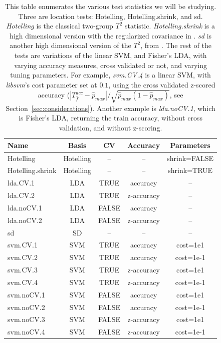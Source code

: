 \documentclass[12pt,a4paper]{article}
\newcommand{\hyp}{f} %
\newcommand{\hypEstim}{\hat{\hyp}} %
\newcommand{\acc}{T^{acc}}
\newcommand{\dominant}{\hat{p}_{max}}
\begin{document}
\begin{table}[th]
\centering
\begin{tabular}{l|c|c|c|c}
Name & Basis & CV & Accuracy & Parameters\\ 
\hline
\hline
Hotelling & Hotelling & -- & -- & shrink=FALSE\\ 
Hotelling.shrink & Hotelling & -- & -- & shrink=TRUE \\ 
lda.CV.1 & LDA & TRUE & accuracy &  -- \\ 
lda.CV.2 & LDA & TRUE & z-accuracy & -- \\ 
lda.noCV.1 & LDA & FALSE & accuracy &  --\\ 
lda.noCV.2 & LDA & FALSE & z-accuracy &  --\\ 
sd & SD & -- & -- & -- \\ 
svm.CV.1 & SVM & TRUE & accuracy & cost=1e1 \\ 
svm.CV.2 & SVM & TRUE & accuracy & cost=1e-1 \\ 
svm.CV.3 & SVM & TRUE & z-accuracy & cost=1e1 \\ 
svm.CV.4 & SVM & TRUE & z-accuracy & cost=1e-1 \\ 
svm.noCV.1 & SVM & FALSE & accuracy & cost=1e1 \\ 
svm.noCV.2 & SVM & FALSE & accuracy & cost=1e-1 \\ 
svm.noCV.3 & SVM & FALSE & z-accuracy & cost=1e1 \\ 
svm.noCV.4 & SVM & FALSE & z-accuracy & cost=1e-1 \\
\end{tabular} 
\caption{\footnotesize
This table enumerates the various test statistics we will be studying. 
Three are location tests: Hotelling, Hotelling.shrink, and sd.
\textit{Hotelling} is the classical two-group $T^2$ statistic. 
\textit{Hotelling.shrink} is a high dimensional version with the regularized covariance in \cite{schafer_shrinkage_2005}. 
\textit{sd} is another high dimensional version of the $T^2$, from \cite{srivastava_two_2013}. 
The rest of the tests are variations of the linear SVM, and Fisher's LDA, with varying accuracy measures, cross validated or not, and varying tuning parameters. 
For example, \textit{svm.CV.4} is a linear SVM, with \textit{libsvm}'s cost parameter set at $0.1$, using the cross validated z-scored accuracy ($|\acc_{\hypEstim}-\dominant|/\sqrt{\dominant(1-\dominant)}$, see Section~\ref{sec:considerations}).
Another example is \textit{lda.noCV.1}, which is Fisher's LDA, returning the train accuracy, without cross validation, and without z-scoring. 
}
\label{tab:collected}
\end{table}
\end{document}
